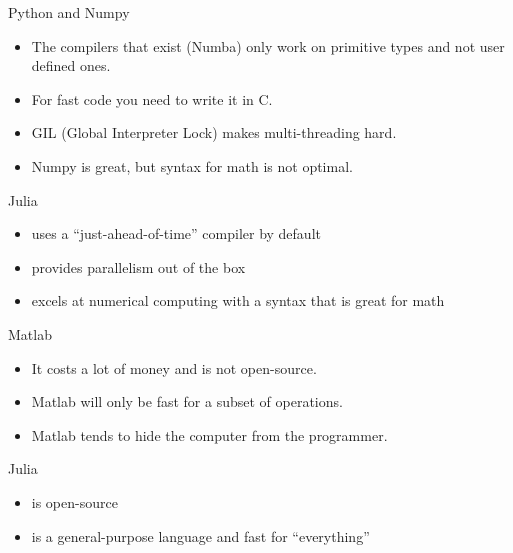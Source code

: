 \documentclass{beamer}
\begin{document}
\begin{frame}{Python and Numpy}
  \begin{itemize}
    \item The compilers that exist (Numba) only work on primitive types and not user defined ones.\itemsep=2mm
    \item For fast code you need to write it in C.
    \item GIL (Global Interpreter Lock) makes multi-threading hard.
    \item Numpy is great, but syntax for math is not optimal.
  \end{itemize}
\vspace*{3mm}
\begin{block}{Julia}
	\begin{itemize}
		\item uses a ``just-ahead-of-time'' compiler by default\itemsep=2mm
		\item provides parallelism out of the box
		\item excels at numerical computing with a syntax that is great for math
	\end{itemize}
\end{block}
\end{frame}

\begin{frame}{Matlab}
  \begin{itemize}
    \item It costs a lot of money and is not open-source.\itemsep=3mm
    \item Matlab will only be fast for a subset of operations.
    \item Matlab tends to hide the computer from the programmer.
  \end{itemize}
\vspace*{3mm}
\begin{block}{Julia}
	\begin{itemize}
		\item is open-source\itemsep=2mm
		\item is a general-purpose language and fast for ``everything''
	\end{itemize}
\end{block}

\end{frame}
\end{document}
